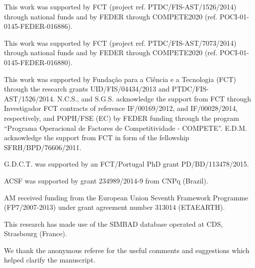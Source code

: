 \documentclass{aa}
\begin{document}
\begin{acknowledgements}

This work was supported by FCT (project ref. PTDC/FIS-AST/1526/2014) through
national funds and by FEDER through COMPETE2020 (ref.
POCI-01-0145-FEDER-016886).

This work was supported by FCT (project ref. PTDC/FIS-AST/7073/2014) through
national funds and by FEDER through COMPETE2020 (ref.
POCI-01-0145-FEDER-016880).

This work was supported by Funda\c{c}\~ao para a Ci\^encia e a Tecnologia (FCT)
through the research grants UID/FIS/04434/2013 and PTDC/FIS-AST/1526/2014.
N.C.S., and S.G.S. acknowledge the support from FCT through Investigador FCT
contracts of reference IF/00169/2012, and IF/00028/2014, respectively, and
POPH/FSE (EC) by FEDER funding through the program “Programa Operacional de
Factores de Competitividade - COMPETE”. E.D.M. acknowledge the support from FCT
in form of the fellowship SFRH/BPD/76606/2011.

G.D.C.T. was supported by an FCT/Portugal PhD grant PD/BD/113478/2015.

ACSF was supported by grant 234989/2014-9 from CNPq (Brazil).

AM received funding from the European Union Seventh Framework Programme
(FP7/2007-2013) under grant agreement number 313014 (ETAEARTH).

This research has made use of the SIMBAD database operated at CDS, Strasbourg
(France).

We thank the anonymous referee for the useful comments and suggestions which
helped clarify the manuscript.

\end{acknowledgements}




\end{document}
